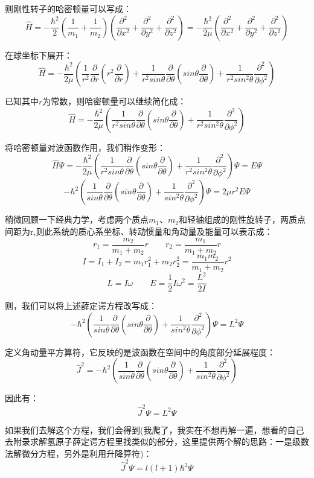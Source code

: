 则刚性转子的哈密顿量可以写成：
\[\hat{H}=-\frac{\hbar^2}{2}\left (\frac{1}{m_1}+\frac{1}{m_2}\right )\left ( \frac{\partial^2}{\partial x^2}+\frac{\partial^2}{\partial y^2}+\frac{\partial^2}{\partial z^2}\right )=-\frac{\hbar^2}{2\mu}\left ( \frac{\partial^2}{\partial x^2}+\frac{\partial^2}{\partial y^2}+\frac{\partial^2}{\partial z^2}\right ) \]

在球坐标下展开：
\[\hat{H}=-\frac{\hbar^2}{2\mu} \left (\frac{1}{r^2}\frac{\partial}{\partial{r}}(r^2\frac{\partial}{\partial{r}})+\frac{1}{r^2sin\theta}\frac{\partial}{\partial{\theta}}(sin\theta\frac{\partial}{\partial{\theta}})+\frac{1}{r^2sin^2 \theta }\frac{\partial^2}{\partial{\phi^2}} \right )\]

已知其中$r$为常数，则哈密顿量可以继续简化成：
\[\hat{H}=-\frac{\hbar^2}{2\mu} \left (\frac{1}{r^2sin\theta}\frac{\partial}{\partial{\theta}}(sin\theta\frac{\partial}{\partial{\theta}})+\frac{1}{r^2sin^2 \theta }\frac{\partial^2}{\partial{\phi^2}} \right )\]

将哈密顿量对波函数作用，我们稍作变形：
\[\hat{H}\varPsi=-\frac{\hbar^2}{2\mu} \left (\frac{1}{r^2sin\theta}\frac{\partial}{\partial{\theta}}(sin\theta\frac{\partial}{\partial{\theta}})+\frac{1}{r^2sin^2 \theta }\frac{\partial^2}{\partial{\phi^2}} \right )\varPsi=E\varPsi\]
\[-\hbar^2\left (\frac{1}{sin\theta}\frac{\partial}{\partial{\theta}}(sin\theta\frac{\partial}{\partial{\theta}})+\frac{1}{sin^2 \theta }\frac{\partial^2}{\partial{\phi^2}} \right )\varPsi=2\mu r^2 E\varPsi\]

稍微回顾一下经典力学，考虑两个质点$m_1$、$m_2$和轻轴组成的刚性旋转子，两质点间距为r,则此系统的质心系坐标、转动惯量和角动量及能量可以表示成：
\[r_1=\frac{m_2}{m_1+m_2}r \qquad r_2=\frac{m_1}{m_1+m_2}r\]
\[I=I_1+I_2=m_1r_1^2+m_2r_2^2=\frac{m_1m_2}{m_1+m_2}r^2\]
\[L=I\omega \qquad E=\frac{1}{2}I\omega^2=\frac{L^2}{2I}\]

则，我们可以将上述薛定谔方程改写成：
\[-\hbar^2\left (\frac{1}{sin\theta}\frac{\partial}{\partial{\theta}}(sin\theta\frac{\partial}{\partial{\theta}})+\frac{1}{sin^2 \theta }\frac{\partial^2}{\partial{\phi^2}} \right )\varPsi=L^2\varPsi\]

定义角动量平方算符，它反映的是波函数在空间中的角度部分延展程度：
\[\hat{J}^2=-\hbar^2\left (\frac{1}{sin\theta}\frac{\partial}{\partial{\theta}}(sin\theta\frac{\partial}{\partial{\theta}})+\frac{1}{sin^2 \theta }\frac{\partial^2}{\partial{\phi^2}} \right )\]

因此有：
\[\hat{J}^2\varPsi=L^2\varPsi\]

如果我们去解这个方程，我们会得到(我爬了，我实在不想再解一遍，想看的自己去附录求解氢原子薛定谔方程里找类似的部分，这里提供两个解的思路：一是级数法解微分方程，另外是利用升降算符)：
\[\hat{J}^2\varPsi=l(l+1)\hbar^2\varPsi\]

